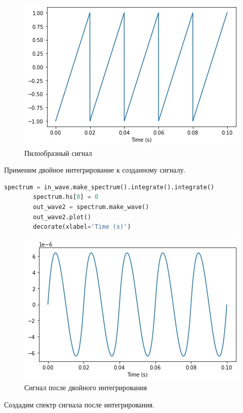 \documentclass[a4paper, 14pt]{extarticle}
\begin{document}
    \begin{figure}[H]
        \centering
        \includegraphics[width=0.8\linewidth]{sawtooth_signal}
        \caption{Пилообразный сигнал}
        \label{fig:sawtooth_signal}
    \end{figure}

    Применим двойное интегрирование к созданному сигналу.

    \begin{lstlisting}[language=Python, caption= Применение двойного интегрирования, label={lst:apply_double_integrate}]
        spectrum = in_wave.make_spectrum().integrate().integrate()
        spectrum.hs[0] = 0
        out_wave2 = spectrum.make_wave()
        out_wave2.plot()
        decorate(xlabel='Time (s)')
    \end{lstlisting}

    \begin{figure}[H]
        \centering
        \includegraphics[width=0.8\linewidth]{sawtooth_double_integrate}
        \caption{Сигнал после двойного интегрирования}
        \label{fig:sawtooth_double_integrate}
    \end{figure}

    Создадим спектр сигнала после интегрирования.
\end{document}
